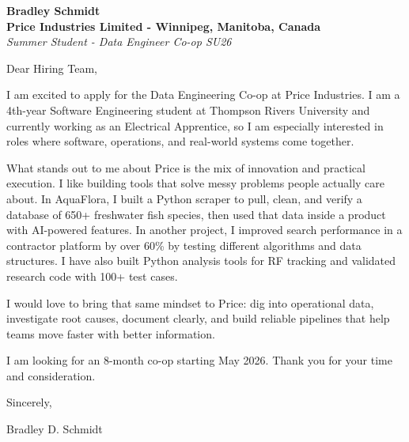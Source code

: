 \documentclass[11pt]{article}
\begin{document}
\textbf{Bradley Schmidt}\\
\vspace{0.5em}
\textbf{Price Industries Limited - Winnipeg, Manitoba, Canada}\\
\textit{Summer Student - Data Engineer Co-op SU26}

Dear Hiring Team,

\par

I am excited to apply for the Data Engineering Co-op at Price Industries. I am a 4th-year Software Engineering student at Thompson Rivers University and currently working as an Electrical Apprentice, so I am especially interested in roles where software, operations, and real-world systems come together.

\par

What stands out to me about Price is the mix of innovation and practical execution. I like building tools that solve messy problems people actually care about. In AquaFlora, I built a Python scraper to pull, clean, and verify a database of 650+ freshwater fish species, then used that data inside a product with AI-powered features. In another project, I improved search performance in a contractor platform by over 60\% by testing different algorithms and data structures. I have also built Python analysis tools for RF tracking and validated research code with 100+ test cases.

\par

I would love to bring that same mindset to Price: dig into operational data, investigate root causes, document clearly, and build reliable pipelines that help teams move faster with better information.

\par

I am looking for an 8-month co-op starting May 2026. Thank you for your time and consideration.

\par

Sincerely,

\par

Bradley D. Schmidt
\end{document}
